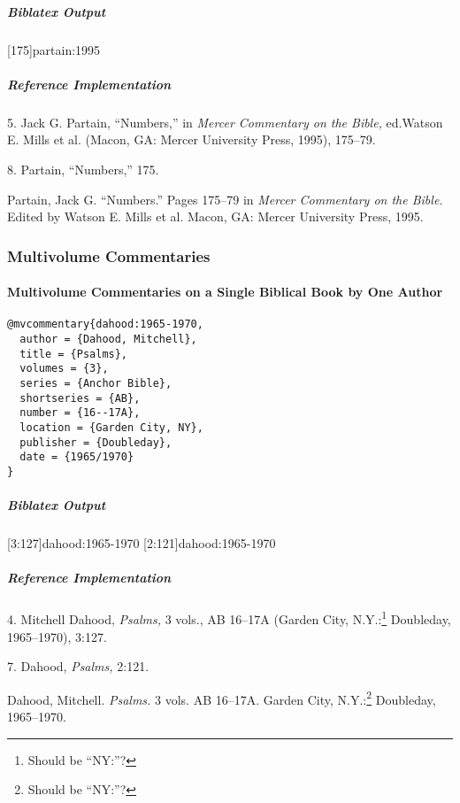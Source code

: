 \documentclass[a4paper]{article}
\newenvironment{biboutput}{%
  \subparagraph{Biblatex Output}
}{\color{black}}
\newenvironment{refimp}{%
  \subparagraph{Reference Implementation}
  \color{reference-colour}
  \rm
}{\par\color{black}}
\begin{document}
\begin{biboutput}
  [175]{partain:1995}
\end{biboutput}

\begin{refimp}
  \hspace*{\bibindent}5. Jack G. Partain, “Numbers,” in \emph{Mercer
  Commentary on the Bible,} ed.\@ Watson E. Mills et al. (Macon, GA: Mercer
  University Press, 1995), 175–79.

  \hspace*{\bibindent}8. Partain, “Numbers,” 175.

  \hangindent\bibindent Partain, Jack G. “Numbers.” Pages 175–79 in
  \emph{Mercer Commentary on the Bible.} Edited by Watson E. Mills et al.
  Macon, GA: Mercer University Press, 1995.
\end{refimp}

\subsubsection{Multivolume Commentaries}

\paragraph{Multivolume Commentaries on a Single Biblical Book by One Author}

\begin{lstlisting}
@mvcommentary{dahood:1965-1970,
  author = {Dahood, Mitchell},
  title = {Psalms},
  volumes = {3},
  series = {Anchor Bible},
  shortseries = {AB},
  number = {16--17A},
  location = {Garden City, NY},
  publisher = {Doubleday},
  date = {1965/1970}
}
\end{lstlisting}

\begin{biboutput}
  [3:127]{dahood:1965-1970}
  [2:121]{dahood:1965-1970}
\end{biboutput}

\begin{refimp}
  \hspace*{\bibindent}4. Mitchell Dahood, \emph{Psalms,} 3 vols., AB 16–17A
  (Garden City, N.Y.:\footnote{Should be “NY:”?} Doubleday, 1965–1970), 3:127.

  \hspace*{\bibindent}7. Dahood, \emph{Psalms,} 2:121.

  \hangindent\bibindent Dahood, Mitchell. \emph{Psalms.} 3 vols. AB 16–17A.
  Garden City, N.Y.:\footnote{Should be “NY:”?} Doubleday, 1965–1970.

\end{refimp}
\end{document}
